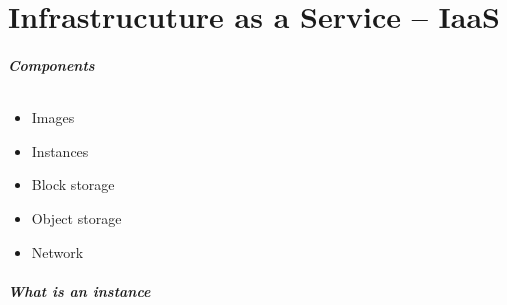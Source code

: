 \part{Infrastrucuture as a Service -- IaaS}

\begin{frame}
\frametitle{Components}
\framesubtitle{}
\begin{itemize}
\item Images
\item Instances
\item Block storage
\item Object storage
\item Network
\end{itemize}
\end{frame}



\begin{frame}
\frametitle{What is an instance}
\framesubtitle{}

\end{frame}
